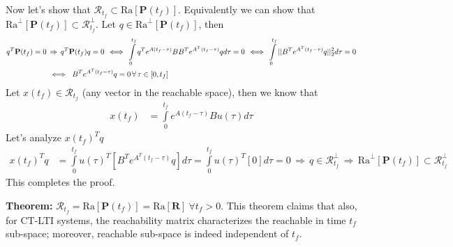 \documentclass[twoside]{article}
\begin{document}
Now let's show that $\mathcal{R}_{t_f} \subset \mathrm{Ra}[ \textbf{P}(t_f) ] $. Equivalently we can show that 
$\mathrm{Ra}^\perp[ \textbf{P}(t_f) ] \subset \mathcal{R}_{t_f}^\perp$. Let $q \in \mathrm{Ra}^\perp[ \textbf{P}(t_f) ]$, then 
%
\begin{align}
\notag
q^T \textbf{P}(t_f) = 0 \, &\Rightarrow \, q^T \textbf{P}(t_f) q = 0 
\, \iff \,
\int\limits_{0}^{t_f} q^T e^{A (t_f - \tau)} B B^T e^{A^T (t_f - \tau)} q d \tau = 0
\, \iff \,
\int\limits_{0}^{t_f} || B^T e^{A^T (t_f - \tau)} q ||_2^2 d \tau = 0
\\
&\iff \ B^T e^{A^T (t_f - \tau)} q = 0 \, \forall \, \tau \in [0 , t_f]
\label{eq:orthGram}
\end{align}
%
Let $x(t_f) \in \mathcal{R}_{t_f}$ (any vector in the reachable space), then we know that
%
\begin{align*}
  x(t_f) &= \int\limits_{0}^{t_f} e^{A (t_f - \tau)} B u(\tau) d \tau
\end{align*}
%
Let's analyze $x(t_f)^T q$
%
\begin{align*}
  x(t_f)^T q &= \int\limits_{0}^{t_f} u(\tau)^T \left[ B^T e^{A^T (t_f - \tau)} q \right] d \tau
  = \int\limits_{0}^{t_f} u(\tau)^T \left[ 0 \right] d \tau = 0
  \, \Rightarrow \, q \in \mathcal{R}_{t_f}^\perp
  \, \Rightarrow \, \mathrm{Ra}^\perp[ \textbf{P}(t_f) ] \subset \mathcal{R}_{t_f}^\perp
\end{align*}
%
This completes the proof.

\textbf{Theorem:} $\mathcal{R}_{t_f} = \mathrm{Ra}[ \textbf{P}(t_f) ] = \mathrm{Ra}[ \mathbf{R} ] \ \forall t_f > 0$. This theorem claims that also, for CT-LTI systems, the reachability matrix characterizes the reachable in time $t_f$ sub-space; moreover, reachable sub-space is indeed independent of $t_f$.
\end{document}
